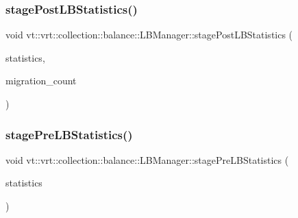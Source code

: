\subsubsection{\texorpdfstring{stage\+Post\+L\+B\+Statistics()}{stagePostLBStatistics()}}
{\footnotesize\ttfamily void vt\+::vrt\+::collection\+::balance\+::\+L\+B\+Manager\+::stage\+Post\+L\+B\+Statistics (\begin{DoxyParamCaption}\item[{const \hyperlink{structvt_1_1vrt_1_1collection_1_1balance_1_1_l_b_manager_a3c6941b9c14a77e015047c659b817a85}{Statistic\+Map\+Type} \&}]{statistics,  }\item[{int32\+\_\+t}]{migration\+\_\+count }\end{DoxyParamCaption})}

\mbox{\label{structvt_1_1vrt_1_1collection_1_1balance_1_1_l_b_manager_a252f9c83adfffa64bbad75c4bf89fce3}} 
\subsubsection{\texorpdfstring{stage\+Pre\+L\+B\+Statistics()}{stagePreLBStatistics()}}
{\footnotesize\ttfamily void vt\+::vrt\+::collection\+::balance\+::\+L\+B\+Manager\+::stage\+Pre\+L\+B\+Statistics (\begin{DoxyParamCaption}\item[{const \hyperlink{structvt_1_1vrt_1_1collection_1_1balance_1_1_l_b_manager_a3c6941b9c14a77e015047c659b817a85}{Statistic\+Map\+Type} \&}]{statistics }\end{DoxyParamCaption})}

\mbox{\label{structvt_1_1vrt_1_1collection_1_1balance_1_1_l_b_manager_a9d93ed4b02b05ff1ed993ce2c6e92356}} 

